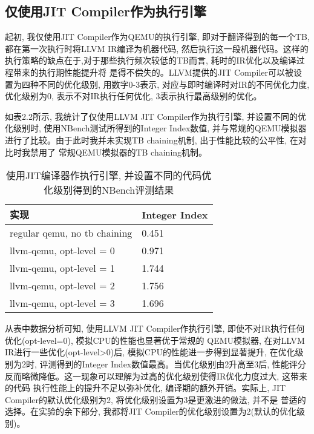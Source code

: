\subsection{仅使用JIT Compiler作为执行引擎}
    起初, 我仅使用JIT Compiler作为QEMU的执行引擎, 即对于翻译得到的每一个TB,都在第一次执行时将LLVM IR编译为机器代码,
    然后执行这一段机器代码。这样的执行策略的缺点在于,对于那些执行频次较低的TB而言, 耗时的IR优化以及编译过程带来的执行期性能提升将
    是得不偿失的。LLVM提供的JIT Compiler可以被设置为四种不同的优化级别, 用数字0-3表示, 对应与即时编译时对IR的不同优化力度,
    优化级别为0, 表示不对IR执行任何优化, 3表示执行最高级别的优化。

    如表2.2所示, 我统计了仅使用LLVM JIT Compiler作为执行引擎, 并设置不同的优化级别时, 使用NBench测试所得到的Integer
    Index数值, 并与常规的QEMU模拟器进行了比较。由于此时我并未实现TB chaining机制, 出于性能比较的公平性, 在对比时我禁用了
    常规QEMU模拟器的TB chaining机制。

    \begin{table}[htbp]
    \begin{minipage}{0.8\textwidth}
    \centering
    \caption{使用JIT编译器作执行引擎, 并设置不同的代码优化级别得到的NBench评测结果}
    \label{tab:parallel1}
    \begin{tabular}{p{4cm}p{4cm}}
    \toprule[1.5pt]
    实现 & Integer Index \\\midrule[1pt]
    regular qemu, no tb chaining & 0.451 \\\midrule[1pt]
    llvm-qemu, opt-level = 0 & 0.971 \\\midrule[1pt]
    llvm-qemu, opt-level = 1 & 1.744 \\\midrule[1pt]
    llvm-qemu, opt-level = 2 & 1.756 \\\midrule[1pt]
    llvm-qemu, opt-level = 3 & 1.696 \\\bottomrule[1.5pt]
    \end{tabular}
    \end{minipage}%
    \end{table}

    从表中数据分析可知, 使用LLVM JIT Compiler作执行引擎, 即使不对IR执行任何优化(opt-level=0), 模拟CPU的性能也显著优于常规的
    QEMU模拟器, 在对LLVM IR进行一些优化(opt-level>0)后, 模拟CPU的性能进一步得到显著提升, 在优化级别为2时, 评测得到的Integer
    Index数值最高。当优化级别由2升高至3后, 性能评分反而略微降低。这一现象可以理解为过高的优化级别使得IR优化力度过大, 这带来的代码
    执行性能上的提升不足以弥补优化, 编译期的额外开销。实际上, JIT Compiler的默认优化级别为2, 将优化级别设置为3是更激进的做法, 并不是
    普适的选择。在实验的余下部分, 我都将JIT Compiler的优化级别设置为2(默认的优化级别)。

